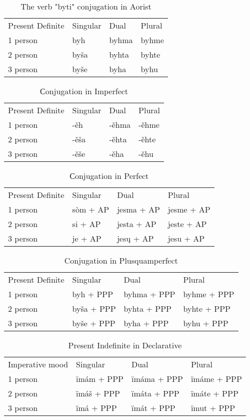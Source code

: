 \begin{table}[!htpb]
	\caption{The verb "byti" conjugation in Aorist}
	\begin{tabular}{llll}
		Present Definite & Singular & Dual & Plural \\
		1 person & byh & byhma & byhme \\
		2 person & byša & byhta & byhte \\
		3 person & byše & byha & byhu 
	\end{tabular}
\end{table}

\begin{table}[!htpb]
	\caption{Сonjugation in Imperfect}
	\begin{tabular}{llll}
		Present Definite & Singular & Dual & Plural \\
		1 person & -ěh & -ěhma & -ěhme \\
		2 person & -ěša & -ěhta & -ěhte \\
		3 person & -ěše & -ěha & -ěhu
	\end{tabular}
\end{table}

\begin{table}[!htpb]
	\caption{Сonjugation in Perfect}
	\begin{tabular}{llll}
		Present Definite & Singular & Dual & Plural \\
		1 person & sòm + AP & jesma + AP & jesme + AP \\
		2 person & si + AP & jesta + AP & jeste  + AP \\
		3 person & je + AP & jesų + AP & jesu + AP 
	\end{tabular}
\end{table}

\begin{table}[!htpb]
	\caption{Conjugation in Plusquamperfect}
	\begin{tabular}{llll}
		Present Definite & Singular & Dual & Plural \\
		1 person & byh + PPP & byhma + PPP & byhme + PPP \\
		2 person & byša + PPP & byhta + PPP & byhte  + PPP \\
		3 person & byše + PPP & byha + PPP & byhu + PPP 
	\end{tabular}
\end{table}



\begin{table}[!htpb]
	\caption{Present Indefinite in Declarative}
	\begin{tabular}{llll}
		Imperative mood & Singular & Dual & Plural \\
		1 person & ïmám + PPP & ïmáma + PPP & ïmáme + PPP \\
		2 person & ïmáš + PPP & ïmáta + PPP & ïmáte + PPP \\
		3 person & ïmá + PPP & ïmát + PPP & ïmut + PPP
	\end{tabular}
\end{table}


